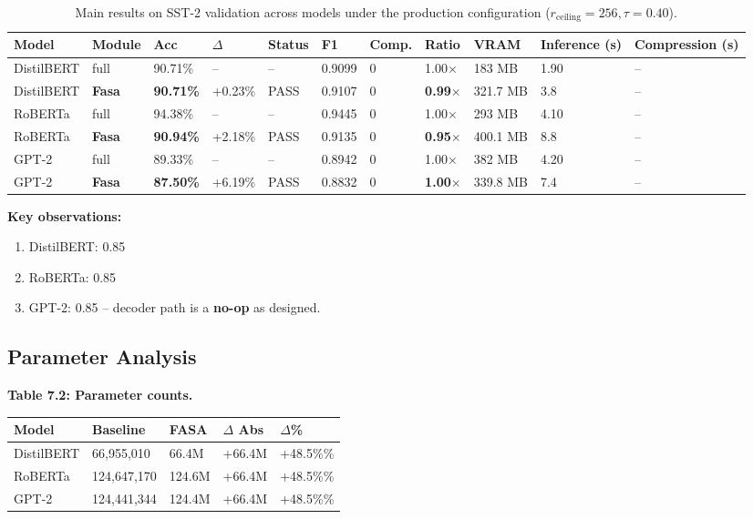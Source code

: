 \begin{table}[t]
\centering
\small
\begin{tabular}{lllllllllll}
\toprule
\textbf{Model} & \textbf{Module} & \textbf{Acc} & \textbf{$\Delta$} & \textbf{Status} & \textbf{F1} & \textbf{Comp.} & \textbf{Ratio} & \textbf{VRAM} & \textbf{Inference (s)} & \textbf{Compression (s)} \\
\midrule
DistilBERT & full & 90.71\% & -- & -- & 0.9099 & 0 & 1.00$\times$ & 183 MB & 1.90 & -- \\
DistilBERT & \textbf{Fasa} & \textbf{90.71\%} & +0.23\% & PASS & 0.9107 & 0 & \textbf{0.99$\times$} & 321.7 MB & 3.8 & -- \\
RoBERTa & full & 94.38\% & -- & -- & 0.9445 & 0 & 1.00$\times$ & 293 MB & 4.10 & -- \\
RoBERTa & \textbf{Fasa} & \textbf{90.94\%} & +2.18\% & PASS & 0.9135 & 0 & \textbf{0.95$\times$} & 400.1 MB & 8.8 & -- \\
GPT-2 & full & 89.33\% & -- & -- & 0.8942 & 0 & 1.00$\times$ & 382 MB & 4.20 & -- \\
GPT-2 & \textbf{Fasa} & \textbf{87.50\%} & +6.19\% & PASS & 0.8832 & 0 & \textbf{1.00$\times$} & 339.8 MB & 7.4 & -- \\
\bottomrule
\end{tabular}
\caption{Main results on SST-2 validation across models under the production configuration ($r_{\mathrm{ceiling}}=256, \tau=0.40$).}
\label{tab:main_sst2}
\end{table}

\textbf{Key observations:}

\begin{enumerate}
\item DistilBERT: 0.85
\item RoBERTa: 0.85
\item GPT-2: 0.85 -- decoder path is a \textbf{no-op} as designed.

\end{enumerate}
\subsection{Parameter Analysis}

\textbf{Table 7.2: Parameter counts.}

\begin{table}[H]
\centering
\small
\begin{tabular}{lllll}
\toprule
\textbf{Model} & \textbf{Baseline} & \textbf{FASA} & \textbf{$\Delta$ Abs} & \textbf{$\Delta$\%} \\
\midrule
DistilBERT & 66,955,010 & 66.4M & +66.4M & +48.5\%\% \\
RoBERTa & 124,647,170 & 124.6M & +66.4M & +48.5\%\% \\
GPT-2 & 124,441,344 & 124.4M & +66.4M & +48.5\%\% \\
\bottomrule
\end{tabular}
\end{table}

